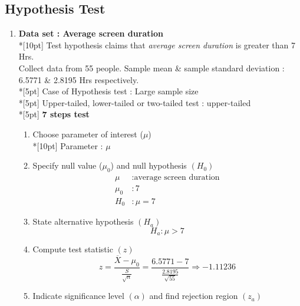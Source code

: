 \subsection*{Hypothesis Test}
\begin{enumerate}
    \item \textbf{Data set : Average screen duration}\\*[10pt]
        Test hypothesis claims that \textit{average screen duration} is greater than 7 Hrs.\\
        Collect data from 55 people. Sample mean & sample standard deviation : 6.5771 \& 2.8195 Hrs respectively.\\*[5pt]
        Case of Hypothesis test : Large sample size\\*[5pt]
        Upper-tailed, lower-tailed or two-tailed test : upper-tailed\\*[5pt]
        \textbf{7 steps test}
        \begin{enumerate}[label=1.\arabic*]
            \item Choose parameter of interest (\(\mu\))\\*[10pt]
                Parameter : \(\mu\)
            \item Specify null value (\(\mu_0\)) and null hypothesis \((H_0)\)\\
            \begin{equation}
                \begin{split}
                    \mu &: \textrm{average screen duration}\\
                    \mu_0 &: 7\\
                    H_0 &: \mu = 7
                \end{split}
            \end{equation}
            \item State alternative hypothesis \((H_a)\)
            \begin{equation}
                H_a : \mu > 7
            \end{equation}
            \item Compute test statistic \((z)\)
            \begin{equation}
                    z = \dfrac{\overline{X}-\mu_0}{\frac{S}{\sqrt{n}}} = \dfrac{6.5771-7}{\frac{2.8195}{\sqrt{55}}} \Rightarrow -1.11236
            \end{equation}
            \item Indicate significance level \((\alpha)\) and find rejection region \((z_a)\)

\end{enumerate}
\end{enumerate}
